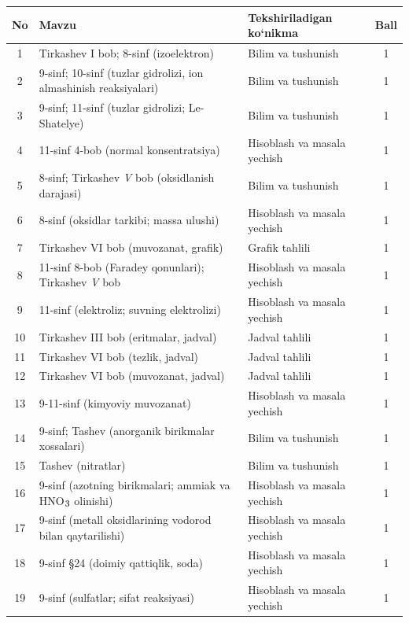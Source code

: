 \documentclass[11pt,a4paper]{article}
\renewcommand{\textsubscript}[1]{\ensuremath{_{\text{\fontsize{8}{8}\selectfont #1}}}}
\begin{document}
{\small\noindent\begin{longtable}{|c|p{7.2cm}|p{5.4cm}|c|}\hline \textbf{No} & \textbf{Mavzu} & \textbf{Tekshiriladigan ko`nikma} & \textbf{Ball}\\\hline
1 & Tirkashev I bob; 8-sinf (izoelektron) & Bilim va tushunish & 1\\\hline
2 & 9-sinf; 10-sinf (tuzlar gidrolizi, ion almashinish reaksiyalari) & Bilim va tushunish & 1\\\hline
3 & 9-sinf; 11-sinf (tuzlar gidrolizi; Le-Shatelye) & Bilim va tushunish & 1\\\hline
4 & 11-sinf 4-bob (normal konsentratsiya) & Hisoblash va masala yechish & 1\\\hline
5 & 8-sinf; Tirkashev \textit{V} bob (oksidlanish darajasi) & Bilim va tushunish & 1\\\hline
6 & 8-sinf (oksidlar tarkibi; massa ulushi) & Hisoblash va masala yechish & 1\\\hline
7 & Tirkashev VI bob (muvozanat, grafik) & Grafik tahlili & 1\\\hline
8 & 11-sinf 8-bob (Faradey qonunlari); Tirkashev \textit{V} bob & Hisoblash va masala yechish & 1\\\hline
9 & 11-sinf (elektroliz; suvning elektrolizi) & Hisoblash va masala yechish & 1\\\hline
10 & Tirkashev III bob (eritmalar, jadval) & Jadval tahlili & 1\\\hline
11 & Tirkashev VI bob (tezlik, jadval) & Jadval tahlili & 1\\\hline
12 & Tirkashev VI bob (muvozanat, jadval) & Jadval tahlili & 1\\\hline
13 & 9-11-sinf (kimyoviy muvozanat) & Hisoblash va masala yechish & 1\\\hline
14 & 9-sinf; Tashev (anorganik birikmalar xossalari) & Bilim va tushunish & 1\\\hline
15 & Tashev (nitratlar) & Bilim va tushunish & 1\\\hline
16 & 9-sinf (azotning birikmalari; ammiak va HNO\textsubscript{3} olinishi) & Hisoblash va masala yechish & 1\\\hline
17 & 9-sinf (metall oksidlarining vodorod bilan qaytarilishi) & Hisoblash va masala yechish & 1\\\hline
18 & 9-sinf \S{}24 (doimiy qattiqlik, soda) & Hisoblash va masala yechish & 1\\\hline
19 & 9-sinf (sulfatlar; sifat reaksiyasi) & Hisoblash va masala yechish & 1\\\hline

\end{longtable}}
\end{document}
